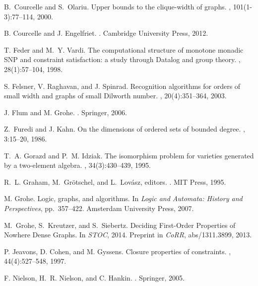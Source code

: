 \documentclass[usletter]{article}
\begin{document}
{\begin{thebibliography}{10}
B.~Courcelle and S.~Olariu.
\newblock Upper bounds to the clique-width of graphs.
, 101(1-3):77--114, 2000.

B. Courcelle and J. Engelfriet.
.
\newblock Cambridge University Press, 2012.

T. Feder and M.~Y. Vardi.
\newblock The computational structure of monotone monadic {SNP} and constraint
  satisfaction: a study through {D}atalog and group theory.
, 28(1):57--104, 1998.

S. Felsner, V. Raghavan, and J. Spinrad.
\newblock Recognition algorithms for orders of small width and graphs of small
  Dilworth number.
, 20(4):351--364, 2003.

J. Flum and M. Grohe.
.
\newblock Springer, 2006.

Z.~Furedi and J. Kahn.
\newblock On the dimensions of ordered sets of bounded degree.
, 3:15--20, 1986.

T.~A. Gorazd and P.~M. Idziak.
\newblock The isomorphism problem for varieties generated by a two-element
  algebra.
, 34(3):430--439, 1995.

R.~L. Graham, M.~Gr\"{o}tschel, and L.~Lov\'{a}sz, editors.
.
\newblock MIT Press, 1995.

M. Grohe.
\newblock Logic, graphs, and algorithms.
\newblock In {\em Logic and
  Automata: History and Perspectives}, pp.\ 357--422. Amsterdam University Press, 2007.

M.~Grohe, S.~Kreutzer, and S.~Siebertz. 
\newblock Deciding First-Order Properties of Nowhere Dense Graphs.  
In {\em STOC}, 2014.  Preprint in {\em CoRR}, abs/1311.3899, 2013.



P. Jeavons, D. Cohen, and M. Gyssens.
\newblock Closure properties of constraints.
, 44(4):527--548, 1997.

F. Nielson, H.~R. Nielson, and C. Hankin.
.
\newblock Springer, 2005.


\end{thebibliography}}
\end{document}
